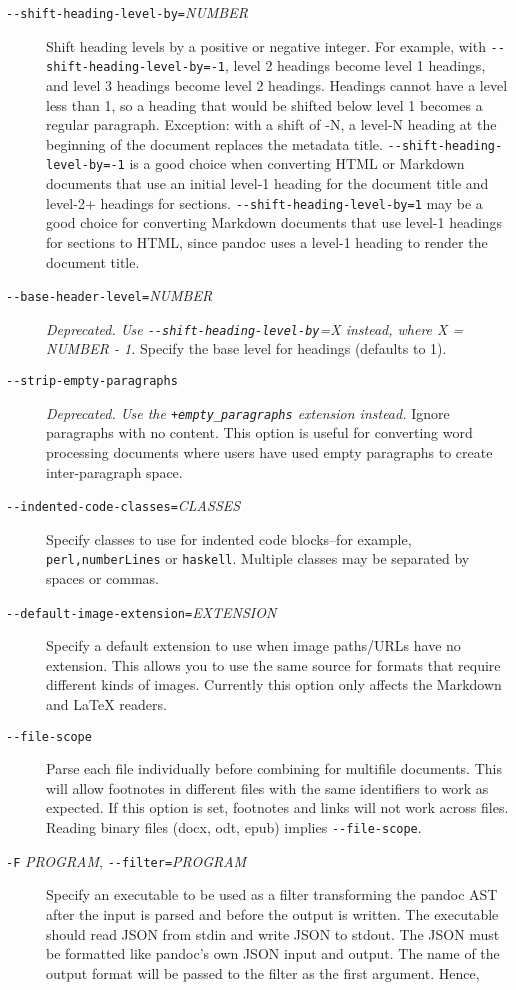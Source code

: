 \documentclass[
]{article}
\begin{document}
\begin{description}
\item[\texttt{-\/-shift-heading-level-by=}\emph{NUMBER}]
Shift heading levels by a positive or negative integer. For example,
with \texttt{-\/-shift-heading-level-by=-1}, level 2 headings become
level 1 headings, and level 3 headings become level 2 headings. Headings
cannot have a level less than 1, so a heading that would be shifted
below level 1 becomes a regular paragraph. Exception: with a shift of
-N, a level-N heading at the beginning of the document replaces the
metadata title. \texttt{-\/-shift-heading-level-by=-1} is a good choice
when converting HTML or Markdown documents that use an initial level-1
heading for the document title and level-2+ headings for sections.
\texttt{-\/-shift-heading-level-by=1} may be a good choice for
converting Markdown documents that use level-1 headings for sections to
HTML, since pandoc uses a level-1 heading to render the document title.
\item[\texttt{-\/-base-header-level=}\emph{NUMBER}]
\emph{Deprecated. Use \texttt{-\/-shift-heading-level-by}=X instead,
where X = NUMBER - 1.} Specify the base level for headings (defaults to
1).
\item[\texttt{-\/-strip-empty-paragraphs}]
\emph{Deprecated. Use the \texttt{+empty\_paragraphs} extension
instead.} Ignore paragraphs with no content. This option is useful for
converting word processing documents where users have used empty
paragraphs to create inter-paragraph space.
\item[\texttt{-\/-indented-code-classes=}\emph{CLASSES}]
Specify classes to use for indented code blocks--for example,
\texttt{perl,numberLines} or \texttt{haskell}. Multiple classes may be
separated by spaces or commas.
\item[\texttt{-\/-default-image-extension=}\emph{EXTENSION}]
Specify a default extension to use when image paths/URLs have no
extension. This allows you to use the same source for formats that
require different kinds of images. Currently this option only affects
the Markdown and LaTeX readers.
\item[\texttt{-\/-file-scope}]
Parse each file individually before combining for multifile documents.
This will allow footnotes in different files with the same identifiers
to work as expected. If this option is set, footnotes and links will not
work across files. Reading binary files (docx, odt, epub) implies
\texttt{-\/-file-scope}.
\item[\texttt{-F} \emph{PROGRAM}, \texttt{-\/-filter=}\emph{PROGRAM}]
Specify an executable to be used as a filter transforming the pandoc AST
after the input is parsed and before the output is written. The
executable should read JSON from stdin and write JSON to stdout. The
JSON must be formatted like pandoc's own JSON input and output. The name
of the output format will be passed to the filter as the first argument.
Hence,


\end{description}
\end{document}
